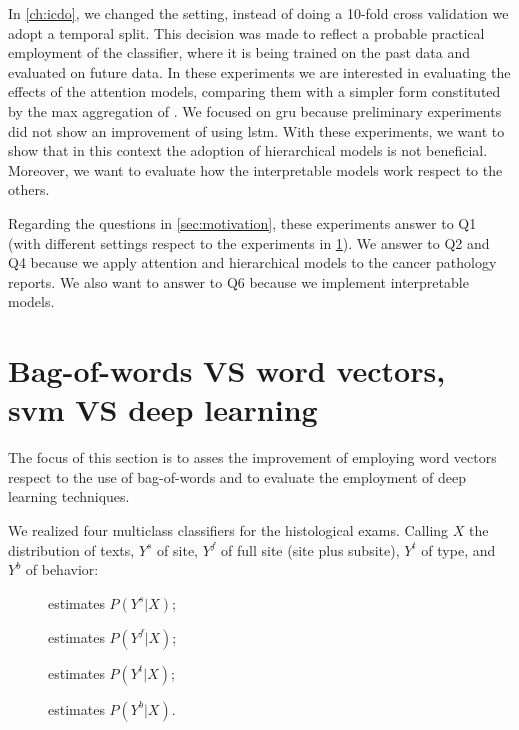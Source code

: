 In \cref{ch:icdo}, we changed the setting, instead of doing a 10-fold
cross validation we adopt a temporal split. This decision was made to
reflect a probable practical employment of the classifier, where it is
being trained on the past data and evaluated on future data. In these
experiments we are interested in evaluating the effects of the
attention models, comparing them with a simpler form constituted by
the max aggregation of \maxp{}. We focused on \ac{gru} because
preliminary experiments did not show an improvement of using
\ac{lstm}. With these experiments, we want to show that in this context
the adoption of hierarchical models is not beneficial. Moreover, we
want to evaluate how the interpretable models work respect to the
others.

Regarding the questions in \cref{sec:motivation}, these experiments
answer to Q1 (with different settings respect to the experiments in
\cref{ch:icdoFirst}). We answer to Q2 and Q4 because we apply attention and
hierarchical models to the cancer pathology reports. We also want to
answer to Q6 because we implement interpretable models. 


\section{Bag-of-words VS word vectors, \ac{svm} VS deep learning}
\label{ch:icdoFirst}
The focus of this section is to asses the improvement of employing
word vectors respect to the use of bag-of-words and to evaluate the
employment of deep learning techniques.

We realized four multiclass classifiers for the
histological exams. Calling $X$ the distribution of texts, $Y^s$
of site, $Y^f$ of full site (site plus subsite), $Y^t$ of type, and
$Y^b$ of behavior:
\begin{description}
  \item[\site{}] estimates $P(Y^s|X)$;
  \item[\fullSite{}] estimates $P(Y^f|X)$;
  \item[\type{}] estimates $P(Y^t|X)$;
  \item[\behaviour{}] estimates $P(Y^b|X)$.
\end{description}


